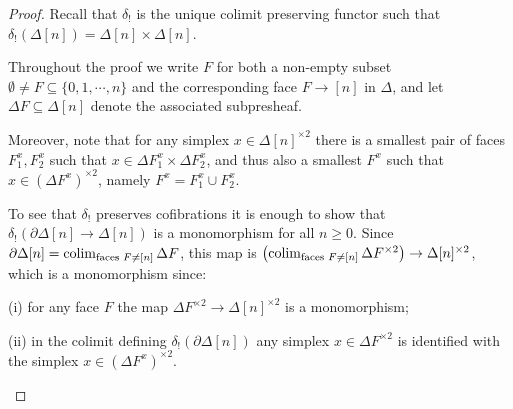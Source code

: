 \documentclass[a4paper,10pt
 ,draft
]{article}%
\begin{document}
\begin{proof}
	Recall that $\delta_!$ is the unique colimit preserving functor such that 
	$\delta_!(\Delta[n])=\Delta[n] \times \Delta[n]$.

Throughout the proof we write $F$ for both a non-empty subset $\emptyset \neq F \subseteq \{0,1,\cdots,n\}$ and the corresponding face $F \to [n]$ in $\Delta$, and let $\Delta F \subseteq \Delta[n]$ denote the associated subpresheaf. 


Moreover, note that for any simplex
$x \in \Delta[n]^{\times 2}$ there is a smallest pair of faces
$F_1^x, F_2^x$ such that
$x \in \Delta F_1^x \times \Delta F_2^x$, and thus also a smallest 
$F^x$ such that $x \in (\Delta F^x)^{\times 2}$,
namely $F^x = F^x_1 \cup F^x_2$.


	To see that $\delta_!$ preserves cofibrations 
	it is enough to show that 
	$\delta_{!}\left( \partial \Delta[n] \to \Delta[n]\right)$
	is a monomorphism for all $n\geq 0$.
	Since
	$\partial \Delta[n] = \mathop{\operatorname{colim}}_{\text{faces }F \neq [n]}\Delta F$, this map is
	$\left(\mathop{\operatorname{colim}}_{\text{faces }F \neq [n]}\Delta F^{\times 2}\right) \to \Delta[n]^{\times 2}$, which is a monomorphism since:
\begin{inparaenum}
	\item[(i)] for any face $F$ the map $\Delta F^{\times 2} \to \Delta[n]^{\times 2}$ is a monomorphism;
	\item[(ii)] in the colimit defining $\delta_{!} \left(\partial \Delta[n]\right)$ any simplex $x \in \Delta F^{\times 2}$ is identified with the simplex $x \in (\Delta F^x)^{\times 2}$.
\end{inparaenum}



\end{proof}
\end{document}

